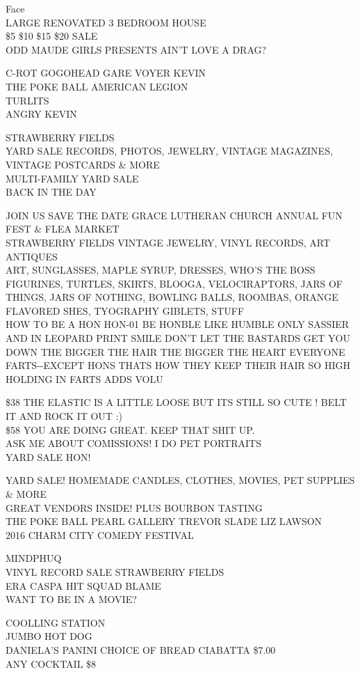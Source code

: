 \documentclass[10pt,letterpaper]{article}
\begin{document}
Face\\
LARGE RENOVATED 3 BEDROOM HOUSE\\
\$5 \$10 \$15 \$20 SALE\\
ODD MAUDE GIRLS PRESENTS AIN'T LOVE A DRAG?

C{-}ROT GOGOHEAD GARE VOYER KEVIN\\
THE POKE BALL AMERICAN LEGION\\
TURLITS\\
ANGRY KEVIN

STRAWBERRY FIELDS\\
YARD SALE RECORDS, PHOTOS, JEWELRY, VINTAGE MAGAZINES, VINTAGE POSTCARDS \& MORE\\
MULTI{-}FAMILY YARD SALE\\
BACK IN THE DAY

JOIN US SAVE THE DATE GRACE LUTHERAN CHURCH ANNUAL FUN FEST \& FLEA MARKET\\
STRAWBERRY FIELDS VINTAGE JEWELRY, VINYL RECORDS, ART ANTIQUES\\
ART, SUNGLASSES, MAPLE SYRUP, DRESSES, WHO'S THE BOSS FIGURINES, TURTLES, SKIRTS, BLOOGA, VELOCIRAPTORS, JARS OF THINGS, JARS OF NOTHING, BOWLING BALLS, ROOMBAS, ORANGE FLAVORED SHES, TYOGRAPHY GIBLETS, STUFF\\
HOW TO BE A HON HON{-}01 BE HONBLE LIKE HUMBLE ONLY SASSIER AND IN LEOPARD PRINT SMILE DON'T LET THE BASTARDS GET YOU DOWN THE BIGGER THE HAIR THE BIGGER THE HEART EVERYONE FARTS{-}{-}EXCEPT HONS THATS HOW THEY KEEP THEIR HAIR SO HIGH HOLDING IN FARTS ADDS VOLU

\$38 THE ELASTIC IS A LITTLE LOOSE BUT ITS STILL SO CUTE !  BELT IT AND ROCK IT OUT :)\\
\$58 YOU ARE DOING GREAT.  KEEP THAT SHIT UP.\\
ASK ME ABOUT COMISSIONS!  I DO PET PORTRAITS\\
YARD SALE HON!

YARD SALE!  HOMEMADE CANDLES, CLOTHES, MOVIES, PET SUPPLIES \& MORE\\
GREAT VENDORS INSIDE!  PLUS BOURBON TASTING\\
THE POKE BALL PEARL GALLERY TREVOR SLADE LIZ LAWSON\\
2016 CHARM CITY COMEDY FESTIVAL

MINDPHUQ\\
VINYL RECORD SALE STRAWBERRY FIELDS\\
ERA CASPA HIT SQUAD BLAME\\
WANT TO BE IN A MOVIE?

COOLLING STATION\\
JUMBO HOT DOG\\
DANIELA'S PANINI CHOICE OF BREAD CIABATTA \$7.00\\
ANY COCKTAIL \$8
\end{document}
